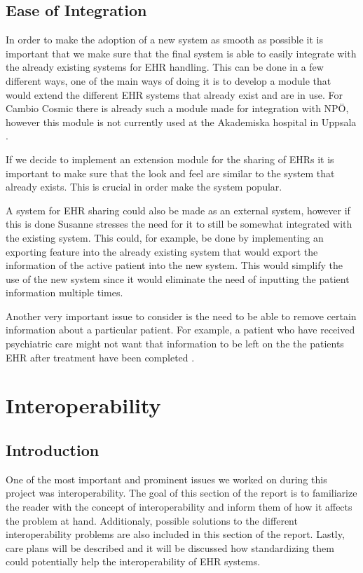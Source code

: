 \documentclass[14pt]{article}
\begin{document}
\subsection{Ease of Integration}
In order to make the adoption of a new system as smooth as possible it is important that we make sure that the final system is able to easily integrate with the already existing systems for \gls{EHR} handling. This can be done in a few different ways, one of the main ways of doing it is to develop a module that would extend the different \gls{EHR} systems that already exist and are in use.\cite{EPJ2} For Cambio Cosmic there is already such a module made for integration with NPÖ, however this module is not currently used at the Akademiska hospital in Uppsala \cite{EPJ1}.

If we decide to implement an extension module for the sharing of \glspl{EHR} it is important to make sure that the look and feel are similar to the system that already exists. This is crucial in order make the system popular. 

A system for \gls{EHR} sharing could also be made as an external system, however if this is done Susanne\cite{EPJ2} stresses the need for it to still be somewhat integrated with the existing system. This could, for example, be done by implementing an exporting feature into the already existing system that would export the information of the active patient into the new system. This would simplify the use of the new system since it would eliminate the need of inputting the patient information multiple times.

Another very important issue to consider is the need to be able to remove certain information about a particular patient. For example, a patient who have received psychiatric care might not want that information to be left on the the patients \gls{EHR} after treatment have been completed \cite{EPJ1}.


\newpage

\section{Interoperability}
\label{sec:Interoperability}

\subsection{Introduction} 
\label{sec:interopIntro}
One of the most important and prominent issues we worked on during this project was interoperability. The goal of this section of the report is to familiarize the reader with the concept of interoperability and inform them of how it affects the problem at hand. Additionaly, possible solutions to the different interoperability problems are also included in this section of the report.  Lastly, care plans will be described and it will be discussed how standardizing them could potentially help the interoperability of \gls{EHR} systems.
\end{document}
